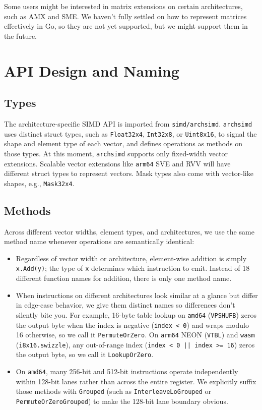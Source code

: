 \documentclass[11pt,a4paper]{article}
\begin{document}
Some users might be interested in matrix extensions on certain architectures, such as AMX and SME. We haven't fully settled on how to represent matrices effectively in Go, so they are not yet supported, but we might support them in the future.

\section{API Design and Naming}

\subsection{Types}

The architecture-specific SIMD API is imported from \texttt{simd/archsimd}. \texttt{archsimd} uses distinct struct types, such as \texttt{Float32x4}, \texttt{Int32x8}, or \texttt{Uint8x16}, to signal the shape and element type of each vector, and defines operations as methods on those types. At this moment, \texttt{archsimd} supports only fixed-width vector extensions. Scalable vector extensions like \texttt{arm64} SVE and RVV will have different struct types to represent vectors. Mask types also come with vector-like shapes, e.g., \texttt{Mask32x4}.

\subsection{Methods}

Across different vector widths, element types, and architectures, we use the same method name whenever operations are semantically identical:

\begin{itemize}
\item Regardless of vector width or architecture, element-wise addition is simply \texttt{x.Add(y)}; the type of \texttt{x} determines which instruction to emit. Instead of 18 different function names for addition, there is only one method name.
\item When instructions on different architectures look similar at a glance but differ in edge-case behavior, we give them distinct names so differences don't silently bite you. For example, 16-byte table lookup on \texttt{amd64} (\texttt{VPSHUFB}) zeros the output byte when the index is negative (\texttt{index < 0}) and wraps modulo 16 otherwise, so we call it \texttt{PermuteOrZero}. On \texttt{arm64} NEON (\texttt{VTBL}) and \texttt{wasm} (\texttt{i8x16.swizzle}), any out-of-range index (\texttt{index < 0 || index >= 16}) zeros the output byte, so we call it \texttt{LookupOrZero}.
\item On \texttt{amd64}, many 256-bit and 512-bit instructions operate independently within 128-bit lanes rather than across the entire register. We explicitly suffix those methods with \texttt{Grouped} (such as \texttt{InterleaveLoGrouped} or \texttt{PermuteOrZeroGrouped}) to make the 128-bit lane boundary obvious.
\end{itemize}
\end{document}
